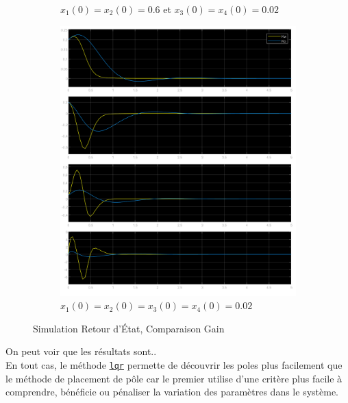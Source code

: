 \documentclass[class=article, crop=false]{standalone}
\begin{document}
\begin{resolution}
\begin{figure}[H]
\begin{subfigure}[b]{0.475\textwidth}
            \caption{$x_1(0) = x_2(0) = 0.6$ et $x_3(0) = x_4(0) = 0.02$}
        \end{subfigure}
        \begin{subfigure}[b]{0.475\textwidth}
            \centering
            \includegraphics[width=\textwidth]{../images/simulink_scope30_0_02.png}
            \caption{$x_1(0) = x_2(0) = x_3(0) = x_4(0) = 0.02$}
        \end{subfigure}
        \caption{Simulation Retour d'État, Comparaison Gain}
    \end{figure}
    On peut voir que les résultats sont..\\
    En tout cas, le méthode \href{https://www.mathworks.com/help/control/ref/lti.lqr.html}{\texttt{lqr}} permette de découvrir les poles plus facilement que le méthode de placement de pôle car le premier utilise d'une critère plus facile à comprendre, bénéficie ou pénaliser la variation des paramètres dans le système.
\end{resolution}
\end{document}
